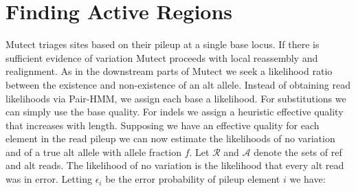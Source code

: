 \documentclass[nofootinbib,amssymb,amsmath]{revtex4}
\begin{document}
\section{Finding Active Regions}
Mutect triages sites based on their pileup at a single base locus.  If there is sufficient evidence of variation Mutect proceeds with local reassembly and realignment.  As in the downstream parts of Mutect we seek a likelihood ratio between the existence and non-existence of an alt allele.  Instead of obtaining read likelihoods via Pair-HMM, we assign each base a likelihood.  For substitutions we can simply use the base quality.  For indels we assign a heuristic effective quality that increases with length.  Supposing we have an effective quality for each element in the read pileup we can now estimate the likelihoods of no variation and of a true alt allele with allele fraction $f$.  Let $\mathcal{R}$ and $\mathcal{A}$ denote the sets of ref and alt reads.  The likelihood of no variation is the likelihood that every alt read was in error.  Letting $\epsilon_i$ be the error probability of pileup element $i$ we have:
\end{document}

